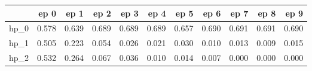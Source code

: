 \begin{tabular}{lrrrrrrrrrr}
\toprule
{} &   ep 0 &   ep 1 &   ep 2 &   ep 3 &   ep 4 &   ep 5 &   ep 6 &   ep 7 &   ep 8 &   ep 9 \\
\midrule
hp\_0 &  0.578 &  0.639 &  0.689 &  0.689 &  0.689 &  0.657 &  0.690 &  0.691 &  0.691 &  0.690 \\
hp\_1 &  0.505 &  0.223 &  0.054 &  0.026 &  0.021 &  0.030 &  0.010 &  0.013 &  0.009 &  0.015 \\
hp\_2 &  0.532 &  0.264 &  0.067 &  0.036 &  0.010 &  0.014 &  0.007 &  0.000 &  0.000 &  0.000 \\
\bottomrule
\end{tabular}
